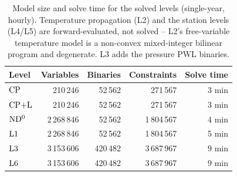 \begin{table}[t]
\centering
\caption{Model size and solve time for the solved levels (single-year, hourly). Temperature
propagation (L2) and the station levels (L4/L5) are forward-evaluated, not solved -- L2's
free-variable temperature model is a non-convex mixed-integer bilinear program and degenerate. L3 adds the pressure PWL binaries.}
\label{tab:computation}
\begin{tabular}{lrrrr}
\hline
Level & Variables & Binaries & Constraints & Solve time \\
\hline
$\mathrm{CP}$ & 210\,246 & 52\,562 & 271\,567 & 3 min \\
$\mathrm{CP{+}L}$ & 210\,246 & 52\,562 & 271\,567 & 3 min \\
$\mathrm{ND^{0}}$ & 2\,268\,846 & 52\,562 & 1\,804\,567 & 4 min \\
$\mathrm{L1}$ & 2\,268\,846 & 52\,562 & 1\,804\,567 & 5 min \\
$\mathrm{L3}$ & 3\,153\,606 & 420\,482 & 3\,687\,967 & 9 min \\
$\mathrm{L6}$ & 3\,153\,606 & 420\,482 & 3\,687\,967 & 9 min \\
\hline
\end{tabular}
\end{table}
